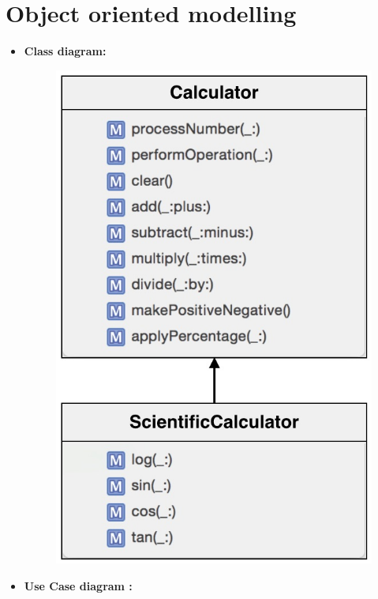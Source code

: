 \documentclass[10pt,a4paper]{article}
\begin{document}
\section{Object oriented modelling}
\begin{itemize}
\item \textbf{Class diagram:}
\begin{figure}[h!]
		\centering
		\includegraphics[scale=0.5]{Sci_Calc_class.jpg}
	\end{figure}

\newpage

\item \textbf{Use Case diagram :}


\end{itemize}
\end{document}
